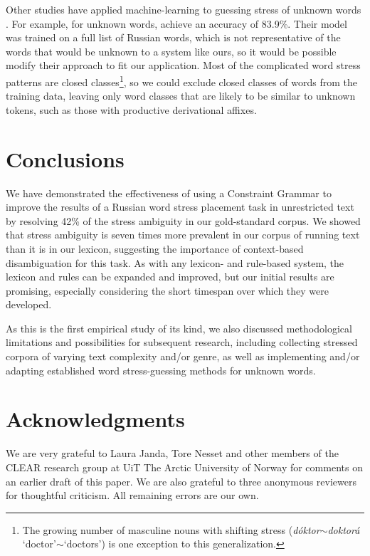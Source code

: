 \documentclass[11pt]{article}
\newcommand{\rr}[1]{\marginpar{\scriptsize R: #1}} %
\begin{document}
Other studies have applied machine-learning to guessing stress of unknown words
\cite{Pearson.Kuhn.ea-00,Webster-04,Dou.Bergsma.ea-09,Hall.Sproat-13}. For example,
for unknown words,  achieve an accuracy of 
83.9\%. Their model was trained on a full list of
Russian words, which is not representative of the words that would be unknown to 
a system like ours, so it would be possible modify their approach to fit our application. 
Most of the complicated word stress patterns are closed 
classes\footnote{The growing number of masculine nouns with shifting stress 
(\emph{d\'{o}ktor$\sim$doktor\'{a}} `doctor'$\sim$`doctors') is one exception 
to this generalization.},
so we could exclude closed classes of words from the training data, leaving only
word classes that are likely to be similar to unknown tokens, such as those with 
productive derivational affixes.
\rr{morphosyntactic disambiguation}

\section{Conclusions}

We have demonstrated the effectiveness of using a Constraint Grammar to improve
the results of a Russian word stress placement task in unrestricted text by 
resolving 42\% of the stress ambiguity in our gold-standard corpus. We showed
that stress ambiguity is seven times more prevalent in our corpus of running text
than it is in our lexicon, suggesting the importance of context-based
disambiguation for this task.  As with any 
lexicon- and rule-based system, the lexicon and rules can be expanded and 
improved, but our initial results are promising, especially considering the short 
timespan over which they were developed.

As this is the first empirical study of its kind, we also discussed 
methodological limitations and possibilities for subsequent research, including
collecting stressed corpora of varying text complexity and/or genre, as well as
implementing and/or adapting established word stress-guessing methods for unknown 
words.

\section*{Acknowledgments}

We are very grateful to Laura Janda, Tore Nesset and other members of the CLEAR
research group at UiT The Arctic University of Norway for comments on an
earlier draft of this paper. We are also grateful to three anonymous reviewers
for thoughtful criticism. All remaining errors are our own.



\end{document}
